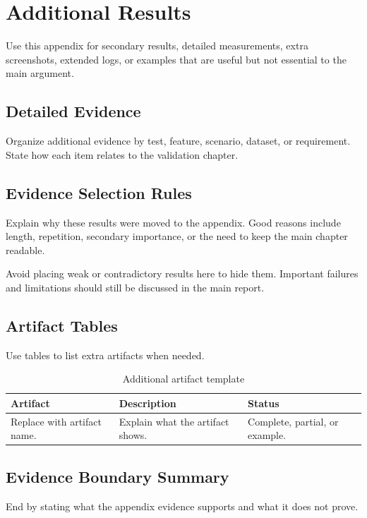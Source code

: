 \chapter{Additional Results}
\label{app:additional-results}

Use this appendix for secondary results, detailed measurements, extra screenshots, extended logs, or examples that are useful but not essential to the main argument.


\section{Detailed Evidence}
Organize additional evidence by test, feature, scenario, dataset, or requirement. State how each item relates to the validation chapter.

\section{Evidence Selection Rules}
Explain why these results were moved to the appendix. Good reasons include length, repetition, secondary importance, or the need to keep the main chapter readable.

Avoid placing weak or contradictory results here to hide them. Important failures and limitations should still be discussed in the main report.

\section{Artifact Tables}
Use tables to list extra artifacts when needed.

\begin{table}[H]
    \centering
    \caption{Additional artifact template}
    \label{tab:additional-artifact-template}
    \small
    \begin{tabular}{L{0.26\textwidth}L{0.40\textwidth}L{0.22\textwidth}}
        \toprule
        \textbf{Artifact} & \textbf{Description} & \textbf{Status} \\
        \midrule
        Replace with artifact name. & Explain what the artifact shows. & Complete, partial, or example. \\
        \bottomrule
    \end{tabular}
\end{table}

\section{Evidence Boundary Summary}
End by stating what the appendix evidence supports and what it does not prove.